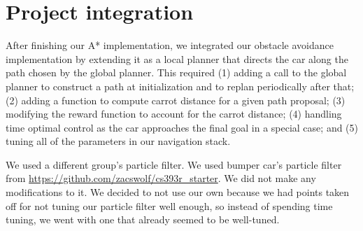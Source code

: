 \section{Project integration}
\label{integ}

After finishing our A* implementation, we integrated our obstacle avoidance implementation by extending it as a local planner that directs the car along the path chosen by the global planner. This required (1) adding a call to the global planner to construct a path at initialization and to replan periodically after that; (2) adding a function to compute carrot distance for a given path proposal; (3) modifying the reward function to account for the carrot distance; (4) handling time optimal control as the car approaches the final goal in a special case; and (5) tuning all of the parameters in our navigation stack. 

We used a different group's particle filter. We used bumper car's particle filter from \url{https://github.com/zacswolf/cs393r_starter}. We did not make any modifications to it. We decided to not use our own because we had points taken off for not tuning our particle filter well enough, so instead of spending time tuning, we went with one that already seemed to be well-tuned. 